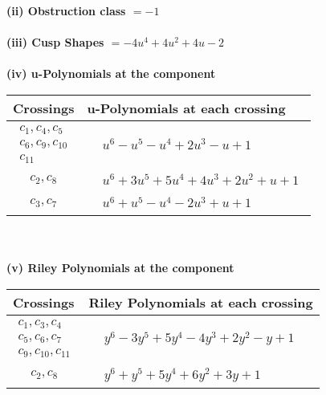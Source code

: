 \documentclass[1p]{elsarticle_modified}
\theoremstyle{definition}
\begin{document}
\flushleft \textbf{(ii) Obstruction class $= -1$}\\~\\
\flushleft \textbf{(iii) Cusp Shapes $= -4 u^4+4 u^2+4 u-2$}\\~\\
\newpage\renewcommand{\arraystretch}{1}
\flushleft \textbf{(iv) u-Polynomials at the component}\newline \\
\begin{tabular}{m{50pt}|m{274pt}}
Crossings & \hspace{64pt}u-Polynomials at each crossing \\
\hline $$\begin{aligned}c_{1},c_{4},c_{5}\\c_{6},c_{9},c_{10}\\c_{11}\end{aligned}$$&$\begin{aligned}
&u^6- u^5- u^4+2 u^3- u+1
\end{aligned}$\\
\hline $$\begin{aligned}c_{2},c_{8}\end{aligned}$$&$\begin{aligned}
&u^6+3 u^5+5 u^4+4 u^3+2 u^2+u+1
\end{aligned}$\\
\hline $$\begin{aligned}c_{3},c_{7}\end{aligned}$$&$\begin{aligned}
&u^6+u^5- u^4-2 u^3+u+1
\end{aligned}$\\
\hline
\end{tabular}\\~\\
\newpage\renewcommand{\arraystretch}{1}
\flushleft \textbf{(v) Riley Polynomials at the component}\newline \\
\begin{tabular}{m{50pt}|m{274pt}}
Crossings & \hspace{64pt}Riley Polynomials at each crossing \\
\hline $$\begin{aligned}c_{1},c_{3},c_{4}\\c_{5},c_{6},c_{7}\\c_{9},c_{10},c_{11}\end{aligned}$$&$\begin{aligned}
&y^6-3 y^5+5 y^4-4 y^3+2 y^2- y+1
\end{aligned}$\\
\hline $$\begin{aligned}c_{2},c_{8}\end{aligned}$$&$\begin{aligned}
&y^6+y^5+5 y^4+6 y^2+3 y+1
\end{aligned}$\\
\hline
\end{tabular}\\~\\
\end{document}
